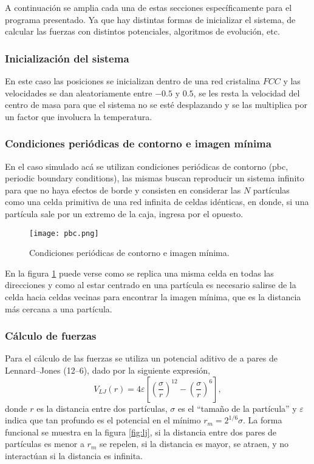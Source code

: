 \documentclass[a4paper,spanish,12pt,twoside]{article}
\begin{document}
A continuación se amplia cada una de estas secciones específicamente para el programa presentado. Ya que hay distintas formas de inicializar el sistema, de calcular las fuerzas con distintos potenciales, algoritmos de evolución, etc.

\subsubsection{Inicialización del sistema}

En este caso las posiciones se inicializan dentro de una red cristalina $FCC$ y las velocidades se dan aleatoriamente entre $-0.5$ y $0.5$, se les resta la velocidad del centro de masa para que el sistema no se esté desplazando y se las multiplica por un factor que involucra la temperatura.


\subsubsection{Condiciones periódicas de contorno e imagen mínima}

En el caso simulado acá se utilizan condiciones periódicas de contorno (pbc, periodic boundary conditions), las mismas buscan reproducir un sistema infinito para que no haya efectos de borde y consisten en considerar las $N$ partículas como una celda primitiva de una red infinita de celdas idénticas, en donde, si una partícula sale por un extremo de la caja, ingresa por el opuesto.

\begin{figure}[h]
	\centering
	\texttt{[image: pbc.png]}
	\caption{Condiciones periódicas de contorno e imagen mínima.}
	\label{fig:pbc}
\end{figure}

En la figura \ref{fig:pbc} puede verse como se replica una misma celda en todas las direcciones y como al estar centrado en una partícula es necesario salirse de la celda hacia celdas vecinas para encontrar la imagen mínima, que es la distancia más cercana a una partícula.

\subsubsection{Cálculo de fuerzas}

Para el cálculo de las fuerzas se utiliza un potencial aditivo de a pares de Lennard--Jones (12--6), dado por la siguiente expresión,
$$
V_{LJ}(r) = 4\varepsilon \left[ \left( \frac{\sigma}{r} \right)^{12} - \left( \frac{\sigma}{r} \right)^6 \right],
$$
donde $r$ es la distancia entre dos partículas, $\sigma$ es el ``tamaño de la partícula'' y $\varepsilon$ indica que tan profundo es el potencial en el mínimo $r_m = 2^{1/6}\sigma$. La forma funcional se muestra en la figura \ref{fig:lj}, si la distancia entre dos pares de partículas es menor a $r_m$ se repelen, si la distancia es mayor, se atraen, y no interactúan si la distancia es infinita.
\end{document}
